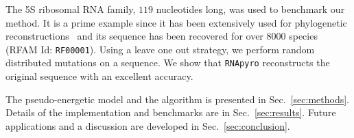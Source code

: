 The 5S ribosomal RNA family, $119$ nucleotides long,  was used to benchmark our method.
It is a prime example since it has been extensively used for phylogenetic
reconstructions~\cite{Hori1987} and its sequence has been recovered for over 8000 species
 (RFAM Id: \texttt{RF00001}).
 Using a leave one out strategy, we perform random distributed mutations on a sequence. We show that
\texttt{RNApyro} reconstructs the original sequence with an excellent accuracy.

The pseudo-energetic model and the algorithm is presented in Sec.~\ref{sec:methods}.
Details of the implementation and benchmarks are in Sec.~\ref{sec:results}. 
Future applications and a discussion are developed in Sec.~\ref{sec:conclusion}.